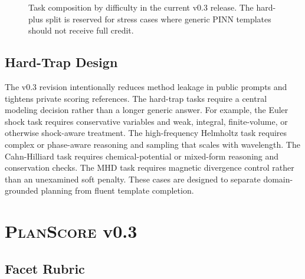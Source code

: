 \documentclass[11pt]{article}
\newcommand{\planscore}{\textsc{PlanScore}}
\begin{document}
\begin{figure}[t]
\centering
{}
\caption{Task composition by difficulty in the current v0.3 release. The hard-plus split is reserved for stress cases where generic PINN templates should not receive full credit.}
\label{fig:task-composition}
\end{figure}

\subsection{Hard-Trap Design}

The v0.3 revision intentionally reduces method leakage in public prompts and tightens private scoring references. The hard-trap tasks require a central modeling decision rather than a longer generic answer. For example, the Euler shock task requires conservative variables and weak, integral, finite-volume, or otherwise shock-aware treatment. The high-frequency Helmholtz task requires complex or phase-aware reasoning and sampling that scales with wavelength. The Cahn-Hilliard task requires chemical-potential or mixed-form reasoning and conservation checks. The MHD task requires magnetic divergence control rather than an unexamined soft penalty. These cases are designed to separate domain-grounded planning from fluent template completion.

\section{\planscore{} v0.3}

\subsection{Facet Rubric}
\end{document}
